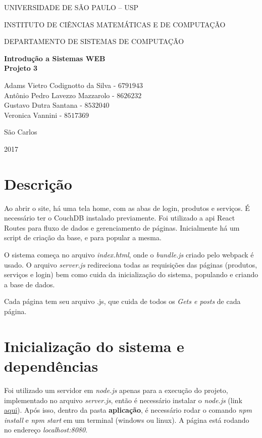 \documentclass[10pt,a4paper]{article}
\newcommand*\NewPage{\newpage\null\thispagestyle{empty}\newpage}
\begin{document}
\thispagestyle{empty}
\begin{center}
	UNIVERSIDADE DE SÃO PAULO – USP
	
	INSTITUTO DE CIÊNCIAS MATEMÁTICAS E DE COMPUTAÇÃO
	
	DEPARTAMENTO DE SISTEMAS DE COMPUTAÇÃO
	
	\vspace{7cm}
	
	\Large{\textbf{Introdução a Sistemas WEB}}\\
	\small{\textbf{Projeto 3}}
	
	\vspace{6cm}
	
	Adams Vietro Codignotto da Silva - $6791943$ \\ 
	Antônio Pedro Lavezzo Mazzarolo - $8626232$ \\
	Gustavo Dutra Santana - $8532040$\\
	Veronica Vannini - $8517369$\\
	
	\vspace{6cm}
	
	São Carlos
	
	2017
\end{center}

\NewPage
{}

\tableofcontents

\newpage

\section{Descrição}
Ao abrir o site, há uma tela home, com as abas de login, produtos e serviços. É necessário ter o CouchDB instalado previamente. Foi utilizado a api React Routes para fluxo de dados e gerenciamento de páginas. Inicialmente há um script de criação da base, e para popular a mesma.



O sistema começa no arquivo \textit{index.html}, onde o \textit{bundle.js} criado pelo webpack é usado. O arquivo \textit{server.js} redireciona todas as requisições das páginas (produtos, serviços e login) bem como cuida da inicialização do sistema, populando e criando a base de dados.

Cada página tem seu arquivo .js, que cuida de todos os \textit{Gets e posts} de cada página.

\section{Inicialização do sistema e dependências}
Foi utilizado um servidor em \textit{node.js} apenas para a execução do projeto, implementado no arquivo \textit{server.js}, então é necessário instalar o \textit{node.js} (link \href{https://nodejs.org/en/}{aqui}). Após isso, dentro da pasta \textbf{aplicação}, é necessário rodar o comando \textit{npm install} e \textit{npm start} em um terminal (windows ou linux). A página está rodando no endereço \textit{localhost:8080}.
\end{document}
